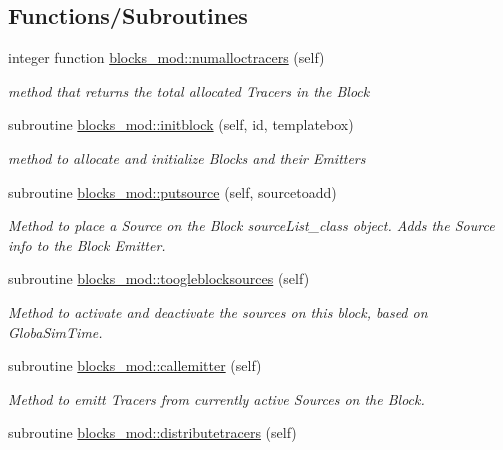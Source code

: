 \subsection*{Functions/\+Subroutines}
\begin{DoxyCompactItemize}
\item 
integer function \mbox{\hyperlink{namespaceblocks__mod_a7202fad0fdc07ff9111e61e3aa513af9}{blocks\+\_\+mod\+::numalloctracers}} (self)
\begin{DoxyCompactList}\small\item\em method that returns the total allocated Tracers in the Block \end{DoxyCompactList}\item 
subroutine \mbox{\hyperlink{namespaceblocks__mod_a534ca69b17b6f54ee07f995b02feff39}{blocks\+\_\+mod\+::initblock}} (self, id, templatebox)
\begin{DoxyCompactList}\small\item\em method to allocate and initialize Blocks and their Emitters \end{DoxyCompactList}\item 
subroutine \mbox{\hyperlink{namespaceblocks__mod_ae3bd1bfeee831f4b41932839495bb108}{blocks\+\_\+mod\+::putsource}} (self, sourcetoadd)
\begin{DoxyCompactList}\small\item\em Method to place a Source on the Block source\+List\+\_\+class object. Adds the Source info to the Block Emitter. \end{DoxyCompactList}\item 
subroutine \mbox{\hyperlink{namespaceblocks__mod_ab9e57cbf0103b632b2b2dfa4e4d4139c}{blocks\+\_\+mod\+::toogleblocksources}} (self)
\begin{DoxyCompactList}\small\item\em Method to activate and deactivate the sources on this block, based on GlobaSim\+Time. \end{DoxyCompactList}\item 
subroutine \mbox{\hyperlink{namespaceblocks__mod_a2c3cf5113e1422d812c2c869afde2729}{blocks\+\_\+mod\+::callemitter}} (self)
\begin{DoxyCompactList}\small\item\em Method to emitt Tracers from currently active Sources on the Block. \end{DoxyCompactList}\item 
subroutine \mbox{\hyperlink{namespaceblocks__mod_aa178415bcc40cf169744d356e1a09c6b}{blocks\+\_\+mod\+::distributetracers}} (self)

\end{DoxyCompactItemize}
